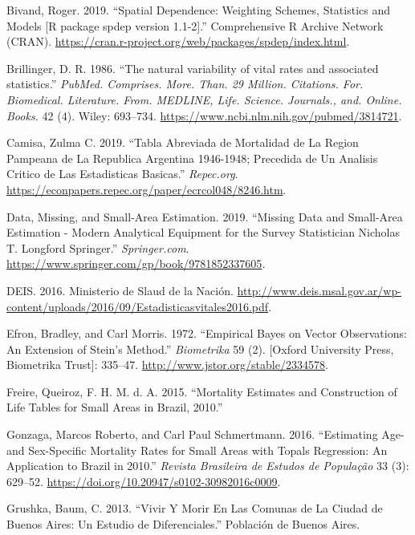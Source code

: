 \documentclass[12pt,]{article}
\begin{document}
\leavevmode\hypertarget{ref-Bivand2019}{}%
Bivand, Roger. 2019. ``Spatial Dependence: Weighting Schemes, Statistics
and Models {[}R package spdep version 1.1-2{]}.'' Comprehensive R
Archive Network (CRAN).
\url{https://cran.r-project.org/web/packages/spdep/index.html}.

\leavevmode\hypertarget{ref-Brillinger1986}{}%
Brillinger, D. R. 1986. ``The natural variability of vital rates and
associated statistics.'' \emph{PubMed. Comprises. More. Than. 29
Million. Citations. For. Biomedical. Literature. From. MEDLINE, Life.
Science. Journals., and. Online. Books.} 42 (4). Wiley: 693--734.
\url{https://www.ncbi.nlm.nih.gov/pubmed/3814721}.

\leavevmode\hypertarget{ref-Camisa_2019}{}%
Camisa, Zulma C. 2019. ``Tabla Abreviada de Mortalidad de La Region
Pampeana de La Republica Argentina 1946-1948; Precedida de Un Analisis
Critico de Las Estadisticas Basicas.'' \emph{Repec.org}.
\url{https://econpapers.repec.org/paper/ecrcol048/8246.htm}.

\leavevmode\hypertarget{ref-Longford2005}{}%
Data, Missing, and Small-Area Estimation. 2019. ``Missing Data and
Small-Area Estimation - Modern Analytical Equipment for the Survey
Statistician \textbar{} Nicholas T. Longford \textbar{} Springer.''
\emph{Springer.com}.
\url{https://www.springer.com/gp/book/9781852337605}.

\leavevmode\hypertarget{ref-DEIS2016}{}%
DEIS. 2016. Ministerio de Slaud de la Nación.
\url{http://www.deis.msal.gov.ar/wp-content/uploads/2016/09/Estadisticasvitales2016.pdf}.

\leavevmode\hypertarget{ref-Efron1972}{}%
Efron, Bradley, and Carl Morris. 1972. ``Empirical Bayes on Vector
Observations: An Extension of Stein's Method.'' \emph{Biometrika} 59
(2). {[}Oxford University Press, Biometrika Trust{]}: 335--47.
\url{http://www.jstor.org/stable/2334578}.

\leavevmode\hypertarget{ref-FreireEtAl2015}{}%
Freire, Queiroz, F. H. M. d. A. 2015. ``Mortality Estimates and
Construction of Life Tables for Small Areas in Brazil, 2010.''

\leavevmode\hypertarget{ref-Gonzaga_Schmertmann_2016}{}%
Gonzaga, Marcos Roberto, and Carl Paul Schmertmann. 2016. ``Estimating
Age- and Sex-Specific Mortality Rates for Small Areas with Topals
Regression: An Application to Brazil in 2010.'' \emph{Revista Brasileira
de Estudos de População} 33 (3): 629--52.
\url{https://doi.org/10.20947/s0102-30982016c0009}.

\leavevmode\hypertarget{ref-Grushka2013}{}%
Grushka, Baum, C. 2013. ``Vivir Y Morir En Las Comunas de La Ciudad de
Buenos Aires: Un Estudio de Diferenciales.'' Población de Buenos Aires.
\end{document}
